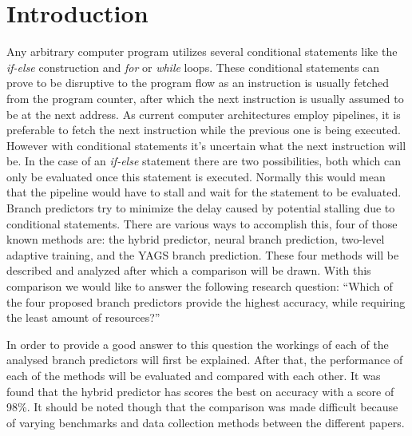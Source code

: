 \section{Introduction}

Any arbitrary computer program utilizes several conditional statements like the \textit{if-else} construction and \textit{for} or \textit{while} loops.
These conditional statements can prove to be disruptive to the program flow as an instruction is usually fetched from the program counter, after which the next instruction is usually assumed to be at the next address.
As current computer architectures employ pipelines, it is preferable to fetch the next instruction while the previous one is being executed.
However with conditional statements it's uncertain what the next instruction will be.
In the case of an \textit{if-else} statement there are two possibilities, both which can only be evaluated once this statement is executed.
Normally this would mean that the pipeline would have to stall and wait for the statement to be evaluated.
Branch predictors try to minimize the delay caused by potential stalling due to conditional statements.
There are various ways to accomplish this, four of those known methods are: the hybrid predictor, neural branch prediction, two-level adaptive training, and the YAGS branch prediction.
These four methods will be described and analyzed after which a comparison will be drawn.
With this comparison we would like to answer the following research question:
\enquote{Which of the four proposed branch predictors provide the highest accuracy, while requiring the least amount of resources?}

In order to provide a good answer to this question the workings of each of the analysed branch predictors will first be explained. 
After that, the performance of each of the methods will be evaluated and compared with each other. 
It  was found that the hybrid predictor has scores the best on accuracy with a score of 98\%.
It should be noted though that the comparison was made difficult because of varying benchmarks and data collection methods between the different papers.